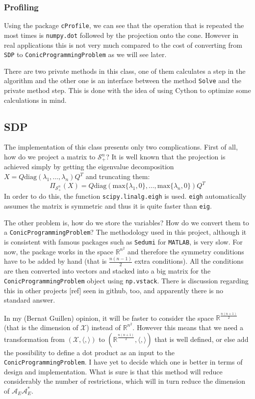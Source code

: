 \documentclass[paper=a4, fontsize=11pt]{scrartcl}
\numberwithin{equation}{section}		%
\numberwithin{figure}{section}			%
\numberwithin{table}{section}				%
\begin{document}
\subsubsection{Profiling}
Using the package \texttt{cProfile}, we can see that the operation that is repeated the most times is \texttt{numpy.dot} followed by the projection onto the cone. However in real applications this is not very much compared to the cost of converting from \texttt{SDP} to \texttt{ConicProgrammingProblem} as we will see later.

There are two private methods in this class, one of them calculates a step in the algorithm and the other one is an interface between the method \texttt{Solve} and the private method step. This is done with the idea of using Cython to optimize some calculations in mind.
\subsection{SDP}
The implementation of this class presents only two complications. First of all, how do we project a matrix to $\mathcal{S}^n_+$? It is well known that the projection is achieved simply by getting the eigenvalue decomposition $X = Q\text{diag}(\lambda_1,\dots,\lambda_n)Q^T$ and truncating them:
\begin{equation}
\Pi_{\mathcal{S}^n_+}(X) = Q\text{diag}(\text{max}\{\lambda_1,0\},\dots,\text{max}\{\lambda_n,0\})Q^T
\end{equation}
In order to do this, the function \texttt{scipy.linalg.eigh} is used. \texttt{eigh} automatically assumes the matrix is symmetric and thus it is quite faster than \texttt{eig}.

The other problem is, how do we store the variables? How do we convert them to a \texttt{ConicProgrammingProblem}? The methodology used in this project, although it is consistent with famous packages such as \texttt{Sedumi} for \texttt{MATLAB}, is very slow. For now, the package works in the space $\mathbb{R}^{n^2}$ and therefore the symmetry conditions have to be added by hand (that is $\frac{n(n-1)}{2}$ extra conditions). All the conditions are then converted into vectors and stacked into a big matrix for the \texttt{ConicProgrammingProblem} object using \texttt{np.vstack}. There is discussion regarding this in other projects [ref] seen in github, too, and apparently there is no standard answer. 

In my (Bernat Guillen) opinion, it will be faster to consider the space $\mathbb{R}^{\frac{n(n+1)}{2}}$ (that is the dimension of $\mathcal{X}$) instead of $\mathbb{R}^{n^2}$. However this means that we need a transformation from $(\mathcal{X},\langle,\rangle)$ to $(\mathbb{R}^{\frac{n(n+1)}{2}},\langle,\rangle)$ that is well defined, or else add the possibility to define a dot product as an input to the  \texttt{ConicProgrammingProblem}. I have yet to decide which one is better in terms of design and implementation. What is sure is that this method will reduce considerably the number of restrictions, which will in turn reduce the dimension of $\mathcal{A}_E\mathcal{A}_E^*$.
\end{document}
